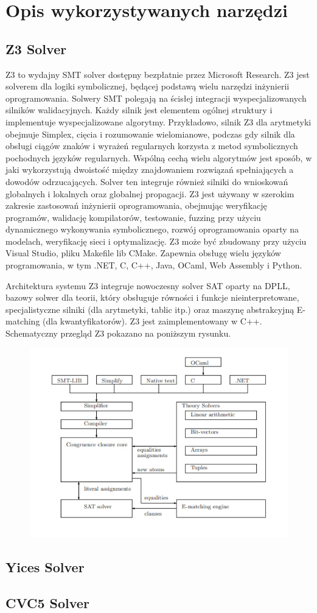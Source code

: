  \usepackage{graphicx}

\chapter{Opis wykorzystywanych narzędzi}

\section{Z3 Solver}
Z3 to wydajny SMT solver dostępny bezpłatnie przez Microsoft Research. Z3 jest solverem dla logiki symbolicznej, będącej podstawą wielu narzędzi inżynierii oprogramowania. Solwery SMT polegają na ścisłej integracji wyspecjalizowanych silników walidacyjnych. Każdy silnik jest elementem ogólnej struktury i implementuje wyspecjalizowane algorytmy. Przykładowo, silnik Z3 dla arytmetyki obejmuje Simplex, cięcia i rozumowanie wielomianowe, podczas gdy silnik dla obsługi ciągów znaków i wyrażeń regularnych korzysta z metod symbolicznych pochodnych języków regularnych. Wspólną cechą wielu algorytmów jest sposób, w jaki wykorzystują dwoistość między znajdowaniem rozwiązań spełniających a dowodów odrzucających. Solver ten integruje również silniki do wnioskowań globalnych i lokalnych oraz globalnej propagacji.
Z3 jest używany w szerokim zakresie zastosowań inżynierii oprogramowania, obejmując weryfikację programów, walidację kompilatorów, testowanie, fuzzing przy użyciu dynamicznego wykonywania symbolicznego, rozwój oprogramowania oparty na modelach, weryfikację sieci i optymalizację.
Z3 może być zbudowany przy użyciu Visual Studio, pliku Makefile lib CMake. Zapewnia obsługę wielu języków programowania, w tym .NET, C, C++, Java, OCaml, Web Assembly i Python.

Architektura systemu
Z3 integruje nowoczesny solver SAT oparty na DPLL, bazowy solwer dla teorii, który obsługuje równości i funkcje nieinterpretowane, specjalistyczne silniki (dla arytmetyki, tablic itp.) oraz maszynę abstrakcyjną E-matching (dla kwantyfikatorów). Z3 jest zaimplementowany w C++. Schematyczny przegląd Z3 pokazano na poniższym rysunku.%
\begin{figure}
	\centering
	\includegraphics[width=0.7\linewidth]{screenshot001}
	\caption{}
	\label{fig:screenshot001}
\end{figure}


\section{Yices Solver}


\section{CVC5 Solver}